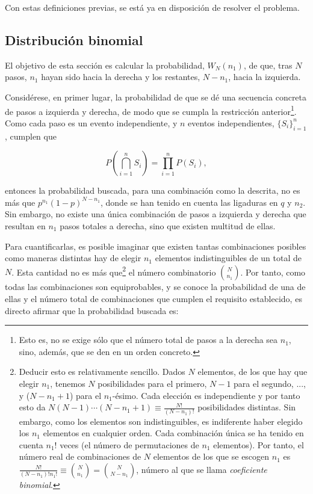 Con estas definiciones previas, se está ya en disposición de resolver el problema.

\subsection{Distribución binomial}
\label{sec:a_binomial}

El objetivo de esta sección es calcular la probabilidad, $W_N(n_1)$, de que, tras $N$ pasos, $n_1$ hayan sido hacia la derecha y los restantes, $N - n_1$, hacia la izquierda. 

Considérese, en primer lugar, la probabilidad de que se dé una secuencia concreta de pasos a izquierda y derecha, de modo que se cumpla la restricción anterior\footnote{Esto es, no se exige sólo que el número total de pasos a la derecha sea $n_1$, sino, además, que se den en un orden concreto.}. Como cada paso es un evento independiente, y $n$ eventos independientes, $\{S_i\}_{i=1}^n$, cumplen que 

\begin{equation}
	P \left(\bigcap\limits^n_{i=1} S_i \right) = \prod\limits^n_{i=1} P\left(S_i\right),
	\label{eq:eventos_independientes}
\end{equation}

\noindent entonces la probabilidad buscada, para una combinación como la descrita, no es más que $p^{n_1} (1-p)^{N-n_1}$, donde se han tenido en cuenta las ligaduras en $q$ y $n_2$. Sin embargo, no existe una única combinación de pasos a izquierda y derecha que resultan en $n_1$ pasos totales a derecha, sino que existen multitud de ellas.

Para cuantificarlas, es posible imaginar que existen tantas combinaciones posibles como maneras distintas hay de elegir $n_1$ elementos indistinguibles de un total de $N$. Esta cantidad no es más que\footnote{Deducir esto es relativamente sencillo. Dados $N$ elementos, de los que hay que elegir $n_1$, tenemos $N$ posibilidades para el primero, $N-1$ para el segundo, ..., y ($N-n_1+1$) para el $n_1$-ésimo. Cada elección es independiente y por tanto esto da $N(N-1)\cdots (N-n_1+1) \equiv \frac{N!}{(N-n_1)!}$ posibilidades distintas. Sin embargo, como los elementos son indistinguibles, es indiferente haber elegido los $n_1$ elementos en cualquier orden. Cada combinación única se ha tenido en cuenta $n_1!$ veces (el número de permutaciones de $n_1$ elementos). Por tanto, el número real de combinaciones de $N$ elementos de los que se escogen $n_1$ es $\frac{N!}{(N-n_1)! n_1!} \equiv \binom{N}{n_1} = \binom{N}{N-n_1}$, número al que se llama \textit{coeficiente binomial}.} el número combinatorio $\binom{N}{n_1}$. Por tanto, como todas las combinaciones son equiprobables, y se conoce la probabilidad de una de ellas y el número total de combinaciones que cumplen el requisito establecido, es directo afirmar que la probabilidad buscada es:

